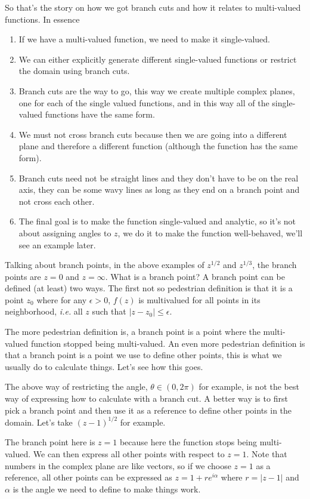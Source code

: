 \documentclass[aps,preprint,preprintnumbers,nofootinbib,showpacs,prd]{revtex4-1}
\newcommand{\ie}{{\it i.e.} }
\begin{document}
So that's the story on how we got branch cuts and how it relates to multi-valued functions. In essence
%
\begin{enumerate}
%
\item If we have a multi-valued function, we need to make it single-valued.
%
\item We can either explicitly generate different single-valued functions or restrict the domain using branch cuts.
%
\item Branch cuts are the way to go, this way we create multiple complex planes, one for each of the single valued functions, and in this way all of the single-valued functions have the same form.
%
\item We must not cross branch cuts because then we are going into a different plane and therefore a different function (although the function has the same form).
%
\item Branch cuts need not be straight lines and they don't have to be on the real axis, they can be some wavy lines as long as they end on a branch point and not cross each other.
%
\item The final goal is to make the function single-valued and analytic, so it's not about assigning angles to $z$, we do it to make the function well-behaved, we'll see an example later.
\end{enumerate}
%

Talking about branch points, in the above examples of $z^{1/2}$ and $z^{1/3}$, the branch points are $z = 0$ and $z = \infty$. What is a branch point? A branch point can be defined (at least) two ways. The first not so pedestrian definition is that it is a point $z_0$ where for any $\epsilon > 0$, $f(z)$ is multivalued for all points in its neighborhood, \ie all $z$ such that $|z - z_0| \le \epsilon$.

The more pedestrian definition is, a branch point is a point where the multi-valued function stopped being multi-valued. An even more pedestrian definition is that a branch point is a point we use to define other points, this is what we usually do to calculate things. Let's see how this goes.

The above way of restricting the angle, $\theta \in (0,2\pi)$ for example, is not the best way of expressing how to calculate with a branch cut. A better way is to first pick a branch point and then use it as a reference to define other points in the domain. Let's take $(z-1)^{1/2}$ for example.

The branch point here is $z=1$ because here the function stops being multi-valued. We can then express all other points with respect to $z = 1$. Note that numbers in the complex plane are like vectors, so if we choose $z=1$ as a reference, all other points can be expressed as $z = 1 + r e^{i\alpha}$ where $r = |z - 1|$ and $\alpha$ is the angle we need to define to make things work.
\end{document}
